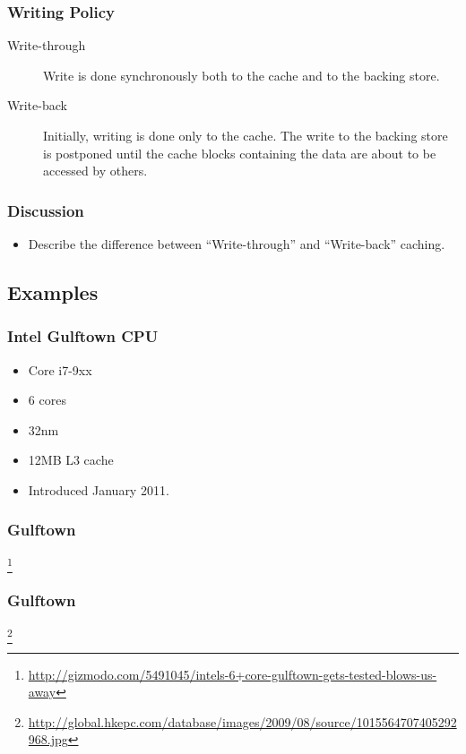 \documentclass{beamer}
\begin{document}
\begin{CJK}{UTF8}{bsmi}
\begin{frame}
\frametitle{Writing Policy}
\begin{description}
\item[Write-through] Write is done synchronously both to the cache and
  to the backing store.
\item[Write-back] Initially, writing is done only to the cache. The
  write to the backing store is postponed until the cache blocks
  containing the data are about to be accessed by others.
\end{description}
\end{frame}


\begin{frame}
\frametitle{Discussion}
\begin{itemize}
\item Describe the difference between ``Write-through'' and
  ``Write-back'' caching.
\end{itemize}
\end{frame}


\subsection{Examples}

\begin{frame}
\frametitle{Intel Gulftown CPU} 
\begin{itemize}
\item Core i7-9xx
\item 6 cores
\item 32nm
\item 12MB L3 cache
\item Introduced January 2011.
\end{itemize}
\end{frame}

\begin{frame}
\frametitle{Gulftown}
\centerline{}
\footnote{\url{http://gizmodo.com/5491045/intels-6+core-gulftown-gets-tested-blows-us-away}}
\end{frame}

\begin{frame}
\frametitle{Gulftown}
\centerline{}
\footnote{\url{http://global.hkepc.com/database/images/2009/08/source/1015564707405292968.jpg}}
\end{frame}


\end{CJK}
\end{document}
